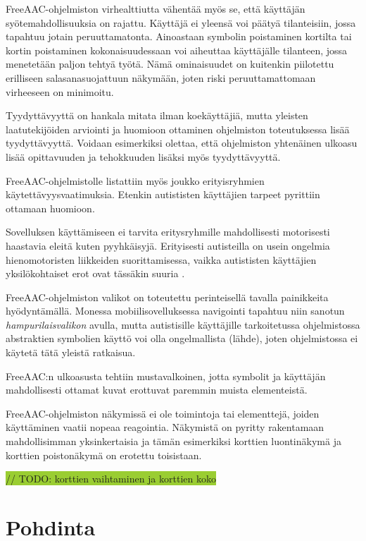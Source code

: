 \documentclass[utf8]{gradu3}
\begin{document}
FreeAAC-ohjelmiston virhealttiutta vähentää myös se, että käyttäjän syötemahdollisuuksia on rajattu. Käyttäjä ei yleensä voi päätyä tilanteisiin, jossa tapahtuu jotain peruuttamatonta. Ainoastaan symbolin poistaminen kortilta tai kortin poistaminen kokonaisuudessaan voi aiheuttaa käyttäjälle tilanteen, jossa menetetään paljon tehtyä työtä. Nämä ominaisuudet on kuitenkin piilotettu erilliseen salasanasuojattuun näkymään, joten riski peruuttamattomaan virheeseen on minimoitu.

Tyydyttävyyttä on hankala mitata ilman koekäyttäjiä, mutta yleisten laatutekijöiden arviointi ja huomioon ottaminen ohjelmiston toteutuksessa lisää tyydyttävyyttä. Voidaan esimerkiksi olettaa, että ohjelmiston yhtenäinen ulkoasu lisää opittavuuden ja tehokkuuden lisäksi myös tyydyttävyyttä.

FreeAAC-ohjelmistolle listattiin myös joukko erityisryhmien käytettävyysvaatimuksia. Etenkin autististen käyttäjien tarpeet pyrittiin ottamaan huomioon.

Sovelluksen käyttämiseen ei tarvita eritysryhmille mahdollisesti motorisesti haastavia eleitä kuten pyyhkäisyjä. Erityisesti autisteilla on usein ongelmia hienomotoristen liikkeiden suorittamisessa, vaikka autististen käyttäjien yksilökohtaiset erot ovat tässäkin suuria \parencite[]{motor-skills-autism}.

FreeAAC-ohjelmiston valikot on toteutettu perinteisellä tavalla painikkeita hyödyntämällä. Monessa mobiilisovelluksessa navigointi tapahtuu niin sanotun \textit{hampurilaisvalikon} avulla, mutta autistisille käyttäjille tarkoitetussa ohjelmistossa abstraktien symbolien käyttö voi olla ongelmallista (lähde), joten ohjelmistossa ei käytetä tätä yleistä ratkaisua.

FreeAAC:n ulkoasusta tehtiin mustavalkoinen, jotta symbolit ja käyttäjän mahdollisesti ottamat kuvat erottuvat paremmin muista elementeistä.

FreeAAC-ohjelmiston näkymissä ei ole toimintoja tai elementtejä, joiden käyttäminen vaatii nopeaa reagointia. Näkymistä on pyritty rakentamaan mahdollisimman yksinkertaisia ja tämän esimerkiksi korttien luontinäkymä ja korttien poistonäkymä on erotettu toisistaan.

\colorbox{YellowGreen}{// TODO: korttien vaihtaminen ja korttien koko}

\chapter{Pohdinta}
\end{document}
